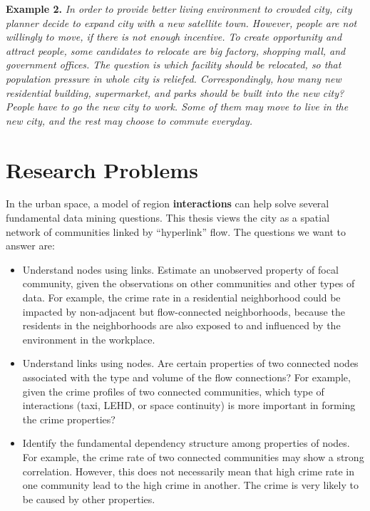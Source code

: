 \textbf{Example 2.} \emph{In order to provide better living environment to crowded city, city planner decide to expand city with a new satellite town. However, people are not willingly to move, if there is not enough incentive. To create opportunity and attract people, some candidates to relocate are big factory, shopping mall, and government offices. The question is which facility should be relocated, so that population pressure in whole  city  is reliefed.  Correspondingly, how many new residential building, supermarket, and parks should be built into the new city? People have to go the new city to work. Some of them may move to live in the new city, and the rest may choose to commute everyday.}





\section{Research Problems}
\label{sec:qa}


In the urban space, a model of region \textbf{interactions} can help solve  several fundamental data mining questions. This thesis views  the city as a spatial network of communities linked by ``hyperlink'' flow. The questions we want to answer are:
\begin{itemize}
\item Understand nodes using links. Estimate an unobserved property of focal community, given the observations on other communities and other types of data. For example, the crime rate in a residential neighborhood could be impacted by  non-adjacent but flow-connected neighborhoods, because the residents in the neighborhoods are also exposed to and influenced by the environment in the workplace.
\item Understand links using nodes. Are certain properties of two connected nodes associated with the type and volume of the flow connections? For example, given the crime profiles of two connected communities, which type of interactions (taxi, LEHD, or space continuity) is more important in forming the crime properties?
\item Identify the fundamental dependency structure among properties of nodes. For example, the crime rate of two connected communities may show a strong correlation. However, this does not necessarily mean that high crime rate in one community lead to the high crime in another. The crime is very likely to be caused by other properties. 
\end{itemize}




